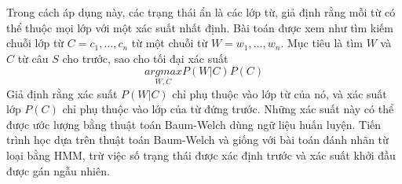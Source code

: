 \documentclass[a4paper,oneside,14pt]{extbook} %
\begin{document}
Trong cách áp dụng này, các trạng thái ẩn là các lớp từ, giả định rằng
mỗi từ có thể thuộc mọi lớp với một xác suất nhất định. Bài toán được
xem như tìm kiếm chuỗi lớp từ $C=c_1,\ldots{},c_n$ từ một chuỗi từ
$W=w_1,\ldots{},w_n$. Mục tiêu là tìm $W$ và $C$ từ câu $S$ cho trước,
sao cho tối đại xác suất$$\underset{W,C}{argmax}P(W|C)P(C)$$
Giả định rằng xác suất $P(W|C)$ chỉ phụ thuộc vào lớp từ của nó, và
xác suất lớp $P(C)$ chỉ phụ thuộc vào lớp của từ đứng trước. Những xác
suất này có thể được ước lượng bằng thuật toán Baum-Welch dùng ngữ
liệu huấn luyện. Tiến trình học dựa trên thuật toán Baum-Welch và
giống với bài toán đánh nhãn từ loại bằng HMM, trừ việc số trạng thái
được xác định trước và xác suất khởi đầu được gán ngẫu nhiên.



\end{document}
